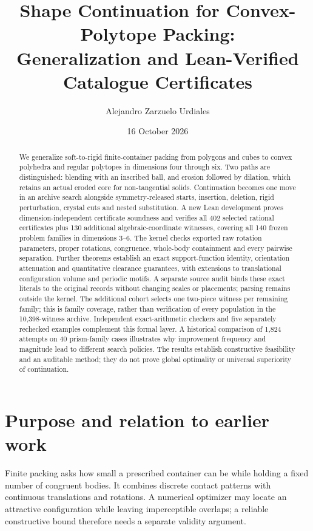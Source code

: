 \documentclass[11pt,a4paper]{article}
\title{Shape Continuation for Convex-Polytope Packing:\\Generalization and Lean-Verified Catalogue Certificates}
\author{Alejandro Zarzuelo Urdiales}
\date{16 October 2026}
\newcommand{\leanRecords}{402}
\newcommand{\leanAlgebraicRecords}{130}
\begin{document}
\maketitle
\begin{abstract}
We generalize soft-to-rigid finite-container packing from polygons and cubes to convex polyhedra and regular polytopes in dimensions four through six. Two paths are distinguished: blending with an inscribed ball, and erosion followed by dilation, which retains an actual eroded core for non-tangential solids. Continuation becomes one move in an archive search alongside symmetry-released starts, insertion, deletion, rigid perturbation, crystal cuts and nested substitution. A new Lean development proves dimension-independent certificate soundness and verifies all \leanRecords{} selected rational certificates plus \leanAlgebraicRecords{} additional algebraic-coordinate witnesses, covering all 140 frozen problem families in dimensions 3--6. The kernel checks exported raw rotation parameters, proper rotations, congruence, whole-body containment and every pairwise separation. Further theorems establish an exact support-function identity, orientation attenuation and quantitative clearance guarantees, with extensions to translational configuration volume and periodic motifs. A separate source audit binds these exact literals to the original records without changing scales or placements; parsing remains outside the kernel. The additional cohort selects one two-piece witness per remaining family; this is family coverage, rather than verification of every population in the 10,398-witness archive. Independent exact-arithmetic checkers and five separately rechecked examples complement this formal layer. A historical comparison of 1,824 attempts on 40 prism-family cases illustrates why improvement frequency and magnitude lead to different search policies. The results establish constructive feasibility and an auditable method; they do not prove global optimality or universal superiority of continuation.
\end{abstract}

\section{Purpose and relation to earlier work}
Finite packing asks how small a prescribed container can be while holding a fixed number of congruent bodies. It combines discrete contact patterns with continuous translations and rotations. A numerical optimizer may locate an attractive configuration while leaving imperceptible overlaps; a reliable constructive bound therefore needs a separate validity argument.
\end{document}
